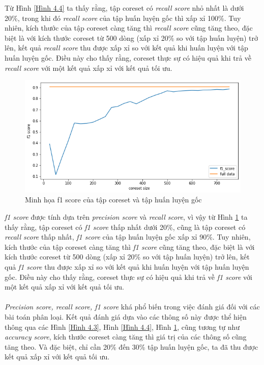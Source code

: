 \documentclass[a4paper, 12pt, oneside]{report}
\begin{document}
Từ Hình \ref{Hình 4.4} ta thấy rằng, tập coreset có \textit{recall score} nhỏ nhất là dưới 20\%, trong khi đó \textit{recall score} của tập huấn luyện gốc thì xấp xỉ 100\%. Tuy nhiên, kích thước của tập coreset càng tăng thì \textit{recall score} cũng tăng theo, đặc biệt là với kích thước coreset từ 500 dòng (xấp xỉ 20\% so với tập huấn luyện) trở lên, kết quả \textit{recall score} thu được xấp xỉ so với kết quả khi huấn luyện với tập huấn luyện gốc. Điều này cho thấy rằng, coreset thực sự có hiệu quả khi trả về \textit{recall score} với một kết quả xấp xỉ với kết quả tối ưu. 
\begin{center}
    \begin{figure}[H]
    \begin{center}
     \includegraphics[scale=0.5]{f1_score_voice_gender.png}
    \end{center}
    \caption{Minh họa f1 score của tập coreset và tập huấn luyện gốc}
    \label{Hình 4.5}
    \end{figure}
\end{center}
\textit{f1 score} được tính dựa trên \textit{precision score} và \textit{recall score}, vì vậy từ Hình \ref{Hình 4.5} ta thấy rằng, tập coreset có \textit{f1 score} thấp nhất dưới 20\%, cũng là tập coreset có \textit{recall score} thấp nhất, \textit{f1 score} của tập huấn luyện gốc xấp xỉ 90\%. Tuy nhiên, kích thước của tập coreset càng tăng thì \textit{f1 score} cũng tăng theo, đặc biệt là với kích thước coreset từ 500 dòng (xấp xỉ 20\% so với tập huấn luyện) trở lên, kết quả \textit{f1 score} thu được xấp xỉ so với kết quả khi huấn luyện với tập huấn luyện gốc. Điều này cho thấy rằng, coreset thực sự có hiệu quả khi trả về \textit{f1 score} với một kết quả xấp xỉ với kết quả tối ưu.\\ \\
\textit{Precision score, recall score, f1 score} khá phổ biến trong việc đánh giá đối với các bài toán phân loại. Kết quả đánh giá dựa vào các thông số này được thể hiện thông qua các Hình \ref{Hình 4.3}, Hình \ref{Hình 4.4}, Hình \ref{Hình 4.5}, cũng tương tự như  \textit{accuracy score}, kích thước coreset càng tăng thì giá trị của các thông số cũng tăng theo. Và đặc biệt, chỉ cần 20\% đến 30\% tập huấn luyện gốc, ta đã thu được kết quả xấp xỉ với kết quả tối ưu. 
\end{document}
